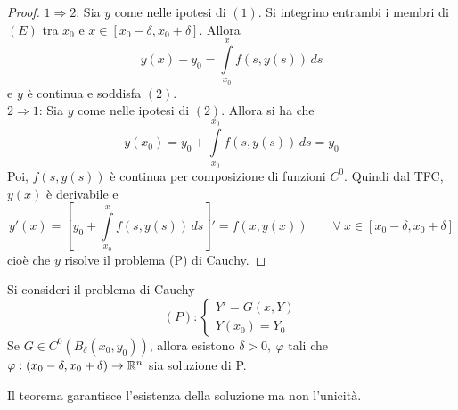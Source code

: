 \begin{proof}
    $1 \Rightarrow 2$: Sia $y$ come nelle ipotesi di $(1)$. Si integrino entrambi i membri di $(E)$ tra $x_0$ e $x \in [x_0-\delta, x_0+\delta]$. Allora
    \begin{equation*}
        y(x)-y_0=\int\limits_{x_0}^{x}{f(s, y(s))}\,ds
    \end{equation*}
    e $y$ è continua e soddisfa $(2)$.\\
    $2 \Rightarrow 1$: Sia $y$ come nelle ipotesi di $(2)$. Allora si ha che
    \begin{equation*}
        y(x_0)= y_0 + \int\limits_{x_0}^{x_0}{f(s, y(s))}\, ds= y_0
    \end{equation*}
    Poi, $f(s, y(s))$ è continua per composizione di funzioni $C^0$. Quindi dal TFC, $y(x)$ è derivabile e
    \begin{equation*}
        y'(x)= \left[y_0 + \int\limits_{x_0}^{x}{f(s, y(s))}\, ds\right]'= f(x, y(x)) \qquad \forall\ x \in [x_0-\delta, x_0+\delta]
    \end{equation*}
    cioè che $y$ risolve il problema (P) di Cauchy.
\end{proof}
\begin{theorem}
Si consideri il problema di Cauchy
\begin{equation*}
    (P): \begin{cases}
        Y'=G(x, Y)\\
        Y(x_0)=Y_0
    \end{cases}
\end{equation*}
Se $G \in C^0(B_\delta(x_0, y_0))$, allora esistono $\delta>0,\ \varphi$ tali che $\varphi: (x_0- \delta, x_0+\delta) \to \mathbb{R}^n$ sia soluzione di P.
\end{theorem}
Il teorema garantisce l'esistenza della soluzione ma non l'unicità.
